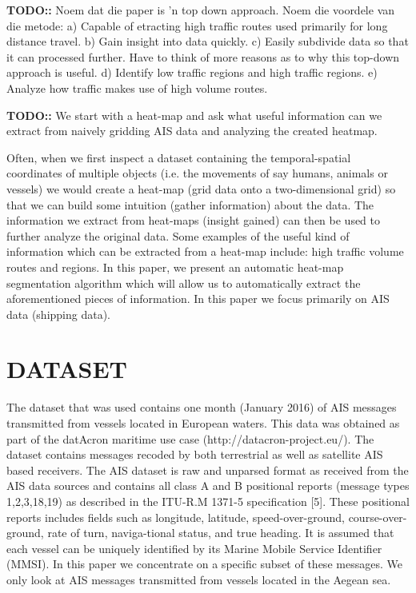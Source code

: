 \documentclass{article}
\begin{document}
\textbf{TODO::} Noem dat die paper is 'n top down approach. Noem die voordele van die metode:
a) Capable of etracting high traffic routes used primarily for long distance travel. b) Gain insight into data quickly. c) Easily subdivide data so that it can processed
further. Have to think of more reasons as to why this top-down approach is useful. d) Identify low traffic regions and high traffic regions. e) Analyze how traffic makes 
use of high volume routes.

\textbf{TODO::} We start with a heat-map and ask what useful information can we extract from naively gridding AIS data and analyzing the created heatmap.

Often, when we first inspect a dataset containing the temporal-spatial coordinates of multiple objects (i.e. the movements of say humans, animals or vessels)
we would create a heat-map (grid data onto a two-dimensional grid) so that we can build some intuition (gather information) about the data.
The information we extract from heat-maps (insight gained) can then be used to further analyze the original data. Some examples of the useful kind of information which can be extracted from a 
heat-map include: high traffic volume routes and regions. In this paper, we present an automatic heat-map segmentation algorithm which will allow us to automatically extract the 
 aforementioned pieces of information. In this paper we focus primarily on AIS data (shipping data). 
 
\section{DATASET}
The dataset that was used contains one month (January 2016) of AIS messages transmitted from vessels located in European waters. This data was
obtained as part of the datAcron maritime use case (http://datacron-project.eu/).  
The dataset contains messages recoded by both terrestrial as well as satellite AIS based receivers. The AIS dataset is raw and unparsed
format as received from the AIS data sources and contains all class A and B positional reports (message types 1,2,3,18,19)
as described in the ITU-R.M 1371-5 specification [5]. These positional reports includes fields such as longitude, latitude,
speed-over-ground, course-over-ground, rate of turn, naviga-tional status, and true heading. It is assumed that each vessel
can be uniquely identified by its Marine Mobile Service Identifier (MMSI). In this paper we concentrate on a specific subset of these messages. 
We only look at AIS messages transmitted from vessels located in the Aegean sea.
\end{document}

